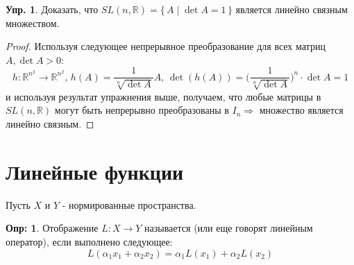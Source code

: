 \documentclass[12pt]{article}
\newcommand{\MR}{\mathbb{R}}
\theoremstyle{definition}
\newtheorem{defn}{Опр:}
\newtheorem{exrc}{Упр.}
\begin{document}
\begin{exrc}
	Доказать, что $SL(n,\MR) = \{\,A \mid \det{A} = 1 \,\}$ является линейно связным множеством.
\end{exrc}
\begin{proof}
	Используя следующее непрерывное преобразование для всех матриц $A, \det{A} > 0$:
	$$
		h \colon \MR^{n^2} \to \MR^{n^2}, \, h(A) = \dfrac{1}{\sqrt[n]{\det{A}}}A, \, \det{(h(A))} = \bigg( \dfrac{1}{\sqrt[n]{\det{A}}}\bigg)^n {\cdot}\det{A} = 1
	$$	
	и используя результат упражнения выше, получаем, что любые матрицы в $SL(n,\MR)$ могут быть непрерывно преобразованы в $I_n \Rightarrow$ множество является линейно связным.
\end{proof}

\newpage
\section*{Линейные функции}
Пусть $X$ и $Y$ - нормированные пространства.
\begin{defn}
	Отображение $L \colon X \to Y$ называется  (или еще говорят линейным оператор), если выполнено следующее: 
	$$
		L(\alpha_1 x_1 + \alpha_2 x_2) = \alpha_1 L(x_1) + \alpha_2 L(x_2)
	$$ 
\end{defn}
\end{document}
